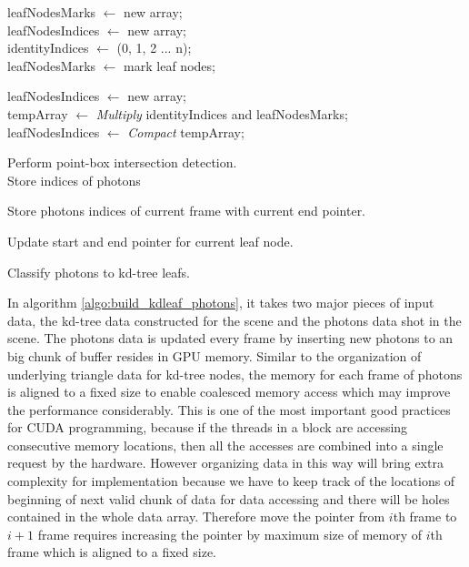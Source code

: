 \begin{spacing}{1.3}

\begin{algorithm}[H]
	\SetAlgoLined

	leafNodesMarks 	\(\leftarrow\) new array; \\
	leafNodesIndices 	\(\leftarrow\) new array; \\
	identityIndices 	\(\leftarrow\) (0, 1, 2 ... n); \\

	 {
		leafNodesMarks \(\leftarrow\) mark leaf nodes; \\
	}

	leafNodesIndices \( \leftarrow \) new array;	 \\
	tempArray \(\leftarrow\) \emph{Multiply} identityIndices and leafNodesMarks; \\
	leafNodesIndices \( \leftarrow \) \emph{Compact} tempArray;
	
	 {
		 {
			Perform point-box intersection detection. \\
			Store indices of photons
		}
	}
	
	 {
		 {
			Store photons indices of current frame with current end pointer.
		}

		Update start and end pointer for current leaf node.
	}
	
	\caption{Classify photons to kd-tree leafs. } 	
	\label{algo:build_kdleaf_photons}
\end{algorithm}

\end{spacing}

\vspace{30pt}

In algorithm \ref{algo:build_kdleaf_photons}, it takes two major pieces of input data, the kd-tree data constructed for the scene and the photons data shot in the scene. The photons data is updated every frame by inserting new photons to an big chunk of buffer resides in GPU memory. Similar to the organization of underlying triangle data for kd-tree nodes, the memory for each frame of photons is aligned to a fixed size to enable coalesced memory access which may improve the performance considerably. This is one of the most important good practices for CUDA programming, because if the threads in a block are accessing consecutive memory locations, then all the accesses are combined into a single request by the hardware. However organizing data in this way will bring extra complexity for implementation because we have to keep track of the locations of beginning of next valid chunk of data for data accessing and there will be holes contained in the whole data array. Therefore move the pointer from \(i\)th frame to \(i+1\) frame requires increasing the pointer by maximum size of memory of \(i\)th frame which is aligned to a fixed size.

